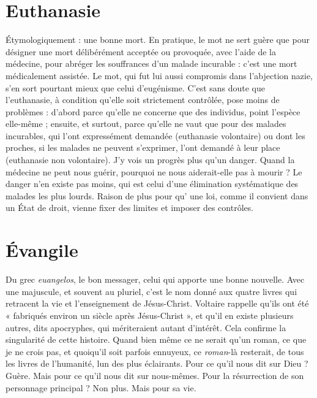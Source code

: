 \section{Euthanasie}
Étymologiquement : une bonne mort. En pratique, le mot
ne sert guère que pour désigner une mort délibérément
acceptée ou provoquée, avec l’aide de la médecine, pour abréger les souffrances
d’un malade incurable : c’est une mort médicalement assistée. Le mot, qui fut
lui aussi compromis dans l’abjection nazie, s’en sort pourtant mieux que celui
d’eugénisme. C’est sans doute que l'euthanasie, à condition qu’elle soit strictement
contrôlée, pose moins de problèmes : d’abord parce qu’elle ne concerne
que des individus, point l'espèce elle-même ; ensuite, et surtout, parce qu’elle
ne vaut que pour des malades incurables, qui l’ont expressément demandée
(euthanasie volontaire) ou dont les proches, si les malades ne peuvent
s'exprimer, l’ont demandé à leur place (euthanasie non volontaire). J'y vois un
progrès plus qu’un danger. Quand la médecine ne peut nous guérir, pourquoi
ne nous aiderait-elle pas à mourir ? Le danger n’en existe pas moins, qui est
celui d’une élimination systématique des malades les plus lourds. Raison de
plus pour qu’ une loi, comme il convient dans un État de droit, vienne fixer des
limites et imposer des contrôles.

\section{Évangile}
Du grec {\it euangelos}, le bon messager, celui qui apporte une
bonne nouvelle. Avec une majuscule, et souvent au pluriel, c’est
le nom donné aux quatre livres qui retracent la vie et l’enseignement de Jésus-Christ.
Voltaire rappelle qu’ils ont été « fabriqués environ un siècle après Jésus-Christ »,
et qu’il en existe plusieurs autres, dits apocryphes, qui mériteraient
autant d'intérêt. Cela confirme la singularité de cette histoire. Quand bien
même ce ne serait qu’un roman, ce que je ne crois pas, et quoiqu'il soit parfois
ennuyeux, ce {\it roman}-là resterait, de tous les livres de l'humanité, lun des plus
éclairants. Pour ce qu’il nous dit sur Dieu ? Guère. Mais pour ce qu’il nous dit
sur nous-mêmes. Pour la résurrection de son personnage principal ? Non plus.
Mais pour sa vie.

